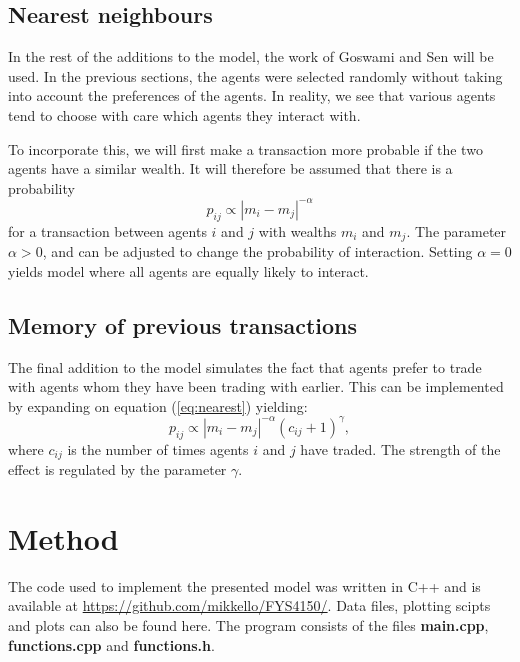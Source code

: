 \documentclass[11pt,a4paper,titlepage]{article}
\begin{document}
\subsection{Nearest neighbours}
In the rest of the additions to the model, the work of Goswami and Sen \cite{Goswami} will be used. In the previous sections, the agents were selected randomly without taking into account the preferences of the agents. In reality, we see that various agents tend to choose with care which agents they interact with.

To incorporate this, we will first make a transaction more probable if the two agents have a similar wealth. It will therefore be assumed that there is a probability
\begin{equation}
\label{eq:nearest}
p_{ij} \propto |m_i - m_j|^{-\alpha}
\end{equation}
for a transaction between agents $i$ and $j$ with wealths $m_i$ and $m_j$. The parameter $\alpha > 0$, and can be adjusted to change the probability of interaction. Setting $\alpha = 0$ yields model where all agents are equally likely to interact. 

\subsection{Memory of previous transactions} 
The final addition to the model simulates the fact that agents prefer to trade with agents whom they have been trading with earlier. This can be implemented by expanding on equation (\ref{eq:nearest}) yielding:
\begin{equation}
p_{ij} \propto |m_i - m_j|^{-\alpha}(c_{ij}+1)^{\gamma},
\end{equation}
where $c_{ij}$ is the number of times agents $i$ and $j$ have traded. The strength of the effect is regulated by the parameter $\gamma$.

\section{Method}
The code used to implement the presented model was written in C++ and is available at \url{https://github.com/mikkello/FYS4150/}. Data files, plotting scipts and plots can also be found here. The program consists of the files \textbf{main.cpp}, \textbf{functions.cpp} and \textbf{functions.h}.
\end{document}
